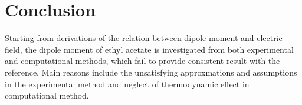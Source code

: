 \documentclass[%
 reprint,
 amsmath,amssymb,
 aps,
10.5pt,
]{revtex4-1}
\begin{document}
\section{Conclusion}
Starting from derivations of the relation between dipole moment and electric field, the dipole moment of ethyl acetate is investigated from both experimental and computational methods, which fail to provide consistent result with the reference. Main reasons include the unsatisfying approxmations and assumptions in the experimental method and neglect of thermodynamic effect in computational method.
\end{document}
